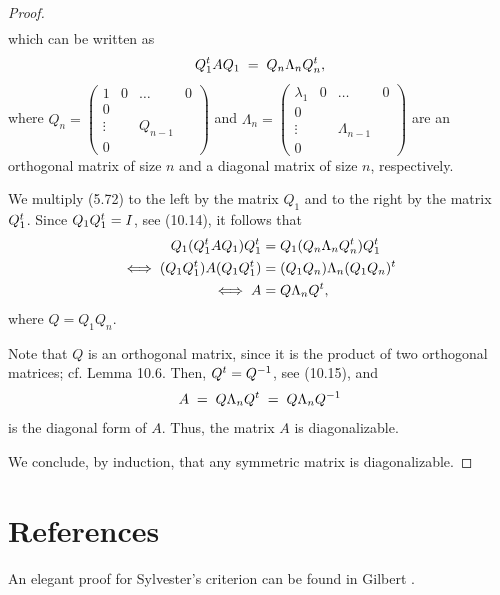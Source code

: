 \begin{proof}
\[\begin{aligned}
\end{aligned}
\]
which can be written as
\begin{equation}
Q_1^{t} AQ_1 \;=\; Q_n\Lambda_nQ_n^{t},
\end{equation}
where $Q_n = \begin{pmatrix} 1 & 0 & \dots & 0\\ 0 & & & \\ \vdots & & Q_{n-1} & \\
0 & & & \end{pmatrix}$ and $\Lambda_n = \begin{pmatrix} \lambda_1 & 0 & \dots & 0\\
0 & & & \\ \vdots & & \Lambda_{n-1} & \\ 0 & & & \end{pmatrix}$ are an orthogonal
matrix of size $n$ and a diagonal matrix of size $n$, respectively.

We multiply (5.72) to the left by the matrix $Q_1$ and to the right by the matrix
$Q_1^{t}$. Since $Q_1Q_1^{t} = I$, see (10.14), it follows that
\[
\begin{aligned}
Q_1(Q_1^{t} AQ_1)Q_1^{t} &= Q_1(Q_n\Lambda_nQ_n^{t})Q_1^{t}\\
\iff (Q_1Q_1^{t})A(Q_1Q_1^{t}) &= (Q_1Q_n)\Lambda_n(Q_1Q_n)^{t}\\
\iff A &= Q\Lambda_nQ^{t},
\end{aligned}
\]
where $Q = Q_1Q_n$.

Note that $Q$ is an orthogonal matrix, since it is the product of two orthogonal
matrices; cf. Lemma 10.6. Then, $Q^{t} = Q^{-1}$, see (10.15), and
\[
A \;=\; Q\Lambda_nQ^{t} \;=\; Q\Lambda_nQ^{-1}
\]
is the diagonal form of $A$. Thus, the matrix $A$ is diagonalizable.

We conclude, by induction, that any symmetric matrix is diagonalizable.
\end{proof}

\section{References}

An elegant proof for Sylvester's criterion can be found in Gilbert \cite{16}.

